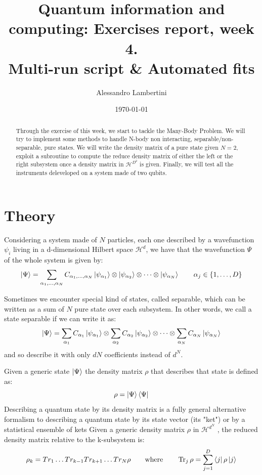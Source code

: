 \documentclass[prb,9pt,notitlepage]{revtex4-1}
\begin{document}
\title{Quantum information and computing: Exercises report, week 4. \\ Multi-run script \& Automated fits }

\author{Alessandro Lambertini}


\date{\today}

\begin{abstract}
Through the exercise of this week,  we start to tackle the Many-Body Problem. We will try to implement some methods to handle N-body non interacting, separable/non-separable, pure states. We will write the density matrix of a pure state given $N=2$, exploit a subroutine to compute the reduce density matrix of either the left or the right subsystem once a density matrix in $\mathcal{H}^{D^2}$ is given. Finally, we will test all the instruments deleveloped on a system made of two qubits.
\end{abstract}

\maketitle

\section{Theory}
Considering a system made of $N$ particles, each one described by a wavefunction $\psi_i$ living in a d-dimensional Hilbert space $\mathcal{H}^d$, we have that the wavefunction $\Psi$ of the whole system is given by:
\begin{equation}
  \ket{\Psi} = \sum_{\alpha_1,\dots,\alpha_N} C_{\alpha_1,\dots,\alpha_N}\ket{\psi_{\alpha_1}}\otimes\ket{\psi_{\alpha_2}}\otimes \dots\otimes\ket{\psi_{\alpha_N}} \qquad \alpha_j \in \{1,\dots,D\}
\end{equation}

Sometimes we encounter special kind of states, called separable, which can be written as a sum of $N$ pure state over each subsystem. In other words, we call a state separable if we can write it as:
\begin{equation}
  \ket{\Psi} = \sum_{\alpha_1}C_{\alpha_1}\ket{\psi_{\alpha_1}}\otimes\sum_{\alpha_2}C_{\alpha_2}\ket{\psi_{\alpha_2}}\otimes\dots\otimes\sum_{\alpha_N}C_{\alpha_N}\ket{\psi_{\alpha_N}}
\end{equation}
and so describe it with only $dN$ coefficients instead of $d^N$.

Given a generic state $\ket{\Psi}$ the density matrix $\rho$ that describes that state is defined as:
\begin{equation}
  \rho = \ket{\Psi}\bra{\Psi}
\end{equation}
Describing a quantum state by its density matrix is a fully general alternative formalism to describing a quantum state by its state vector (its "ket") or by a statistical ensemble of kets
Given a generic density matrix $\rho$ in $\mathcal{H}^{d^N}$ , the reduced density matrix relative to the k-subsystem is:
\begin{equation}
  \rho_k = Tr_1\dots Tr_{k-1}Tr_{k+1}\dots Tr_N\rho \qquad \mbox{where} \qquad \Tr_j\rho = \sum_{j=1}^D\bra{j}\rho\ket{j}
\end{equation}
\end{document}
